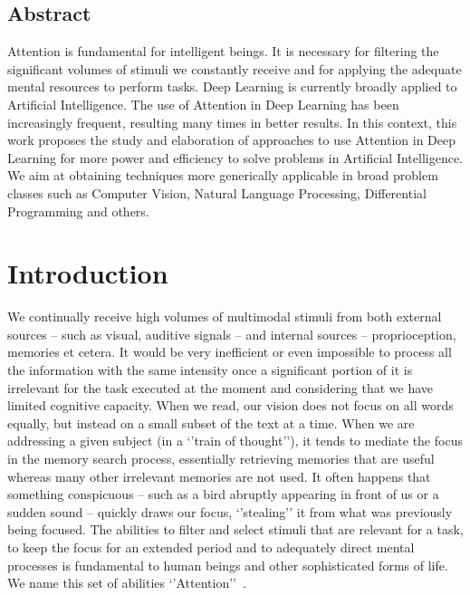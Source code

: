 \documentclass[English]{style/ic-tese-v3}
\begin{document}


\paginasiniciais
\section*{Abstract}
Attention is fundamental for intelligent beings.
It is necessary for filtering the significant volumes of stimuli we constantly receive
and for applying the adequate mental resources to perform tasks.
Deep Learning is currently broadly applied to Artificial Intelligence.
The use of Attention in Deep Learning has been increasingly frequent,
resulting many times in better results.
In this context, this work proposes the study and elaboration of approaches to use Attention in Deep Learning
for more power and efficiency to solve problems in Artificial Intelligence.
We aim at obtaining techniques more generically applicable in broad problem classes
such as Computer Vision, Natural Language Processing, Differential Programming and others.
\fimdaspaginasiniciais


\chapter{Introduction}
We continually receive high volumes of multimodal stimuli from both external sources
-- such as visual, auditive signals -- and internal sources -- proprioception, memories et cetera.
It would be very inefficient or even impossible to process all the information with
the same intensity once a significant portion of it is irrelevant for
the task executed at the moment and considering that we have limited cognitive capacity.
When we read, our vision does not focus on all
words equally, but instead on a small subset of the text at a time.
When we are addressing a given subject (in a `'train of thought''), it tends to mediate the focus
in the memory search process, essentially retrieving memories that
are useful whereas many other irrelevant memories are not used.
It often happens that something conspicuous
-- such as a bird abruptly appearing in front of us or a sudden sound --
quickly draws our focus, `'stealing'' it from what was previously being focused.
The abilities to filter and select stimuli that are relevant for a task, to keep the focus for an
extended period and to adequately direct mental processes is fundamental to
human beings and other sophisticated forms of life.
We name this set of abilities `'Attention''~\cite{ref:esther-thesis}.
\end{document}
